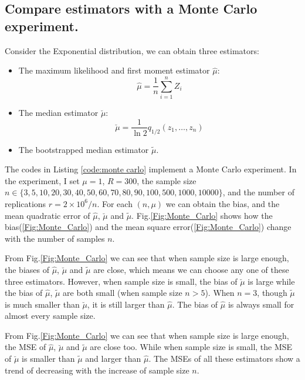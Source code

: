 \documentclass[conference,onecolumn]{IEEEtran}
\begin{document}
\subsection{Compare estimators with a Monte Carlo experiment.}
Consider the Exponential distribution, we can obtain three estimators:
\begin{itemize}
	\item The maximum likelihood and first moment estimator $\widehat\mu$: 
	\begin{equation}
	\widehat{\mu} = \frac{1}{n}\sum_{i=1}^n Z_i
	\end{equation}
	\item The median estimator $\breve{\mu}$:
	\begin{equation}
	\breve{\mu} = \frac{1}{\ln 2} q_{1/2} (z_1,\dots,z_n)
	\end{equation}
	\item The bootstrapped median estimator $\widetilde{\mu}$.
\end{itemize}


The codes in Listing \ref{code:monte carlo} implement a Monte Carlo experiment. In the experiment, I set $\mu=1$, $R=300$, the sample size $n\in\{3,5,10,20,30,40,50,60,70,80,90,100,500,1000,10000\}$, and the number of replications $r=2\times 10^6/n$. For each $(n,\mu)$ we can obtain the bias, and the mean quadratic error of $\widehat{\mu}$, $\breve{\mu}$ and $\widetilde{\mu}$. Fig.\ref{Fig:Monte_Carlo} shows how the bias(\ref{Fig:Monte_Carlo}) and the mean square error(\ref{Fig:Monte_Carlo}) change with the number of samples $n$.

From Fig.\ref{Fig:Monte_Carlo} we can see that when sample size is large enough, the biases of $\widehat{\mu}$, $\breve{\mu}$ and $\widetilde{\mu}$ are close, which means we can choose any one of these three estimators. However, when sample size is small, the bias of $\breve{\mu}$ is large while the bias of $\widehat{\mu}$, $\widetilde{\mu}$ are both small (when sample size $n>5$). When $n=3$, though $\widetilde{\mu}$ is much smaller than $\breve{\mu}$, it is still larger than $\widehat{\mu}$. The bias of $\widehat{\mu}$ is always small for almost every sample size.

From Fig.\ref{Fig:Monte_Carlo} we can see that when sample size is large enough, the MSE of $\widehat{\mu}$, $\breve{\mu}$ and $\widetilde{\mu}$ are close too. While when sample size is small, the MSE of  $\breve{\mu}$ is smaller than $\widetilde{\mu}$ and larger than $\widehat{\mu}$. The MSEs of all these estimators show a trend of decreasing with the increase of sample size $n$.
\end{document}
